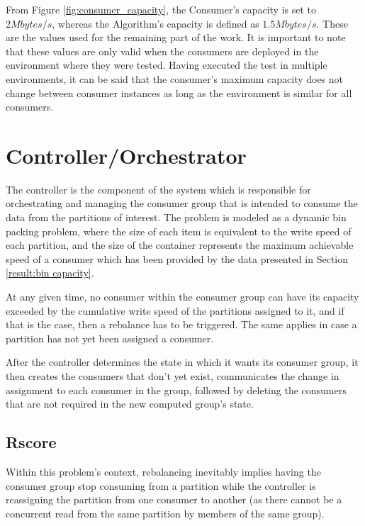 From Figure \ref{fig:consumer_capacity}, the Consumer's capacity is set to $2
Mbytes/s$, whereas the Algorithm's capacity is defined as $1.5 Mbytes/s$.  These are
the values used for the remaining part of the work.  It is important to note
that these values are only valid when the consumers are deployed in the
environment where they were tested. Having executed the test in multiple
environments, it can be said that the consumer's maximum capacity does not
change between consumer instances as long as the environment is similar for all
consumers.

\section{Controller/Orchestrator} \label{component:controller}

The controller is the component of the system which is responsible for
orchestrating and managing the consumer group that is intended to consume the
data from the partitions of interest.  The problem is modeled as a dynamic bin
packing problem, where the size of each item is equivalent to the write speed of
each partition, and the size of the container represents the maximum achievable
speed of a consumer which has been provided by the data presented in Section
\ref{result:bin capacity}.

At any given time, no consumer within the consumer group can have its capacity
exceeded by the cumulative write speed of the partitions assigned to it, and if
that is the case, then a rebalance has to be triggered. The same applies in case
a partition has not yet been assigned a consumer.

After the controller determines the state in which it wants its consumer group,
it then creates the consumers that don't yet exist, communicates the change in
assignment to each consumer in the group, followed by deleting the consumers
that are not required in the new computed group's state.

\subsection{Rscore}
\label{sub:rscore}

Within this problem's context, rebalancing inevitably implies having the
consumer group stop consuming from a partition while the controller is
reassigning the partition from one consumer to another (as there cannot be a
concurrent read from the same partition by members of the same group).

